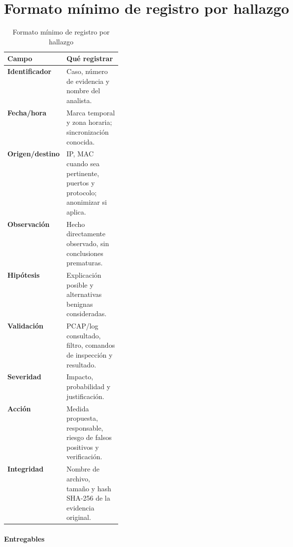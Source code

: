 \section{Formato m\'inimo de registro por hallazgo}
\begin{table}[H]
\centering
\small
\caption[Formato mínimo de registro por hallazgo (tabla 1)]{Formato mínimo de registro por hallazgo}
\begin{tabularx}{\linewidth}{>{\raggedright\arraybackslash}p{0.27\linewidth} >{\raggedright\arraybackslash}X}
\toprule
\textbf{Campo } & \textbf{Qué registrar} \\
\midrule
\textbf{Identificador} & Caso, número de evidencia y nombre del \newline analista. \\
\textbf{Fecha/\allowbreak{}hora} & Marca temporal y zona horaria; sincronización \newline conocida. \\
\textbf{Origen/\allowbreak{}destino} & IP, MAC cuando sea pertinente, puertos y \newline protocolo; anonimizar si aplica. \\
\textbf{Observación} & Hecho directamente observado, sin \newline conclusiones prematuras. \\
\textbf{Hipótesis} & Explicación posible y alternativas benignas \newline consideradas. \\
\textbf{Validación} & PCAP/\allowbreak{}log consultado, filtro, comandos de \newline inspección y resultado. \\
\textbf{Severidad} & Impacto, probabilidad y justificación. \\
\textbf{Acción} & Medida propuesta, responsable, riesgo de falsos \newline positivos y verificación. \\
\textbf{Integridad} & Nombre de archivo, tamaño y hash SHA-256 de \newline la evidencia original. \\
\bottomrule
\end{tabularx}
\end{table}

\paragraph{Entregables}

